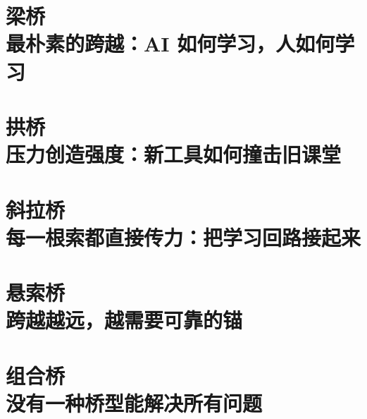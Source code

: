 \documentclass[UTF8,a4paper,openany,12pt]{ctexbook}
\begin{document}
\newpage



\part[梁桥]{梁桥\\[4pt] {\large\color{muted}最朴素的跨越：AI 如何学习，人如何学习}}




\part[拱桥]{拱桥\\[4pt] {\large\color{muted}压力创造强度：新工具如何撞击旧课堂}}




\part[斜拉桥]{斜拉桥\\[4pt] {\large\color{muted}每一根索都直接传力：把学习回路接起来}}




\part[悬索桥]{悬索桥\\[4pt] {\large\color{muted}跨越越远，越需要可靠的锚}}




\part[组合桥]{组合桥\\[4pt] {\large\color{muted}没有一种桥型能解决所有问题}}






\appendix







\printbibliography[title={参考文献}]
\end{document}
